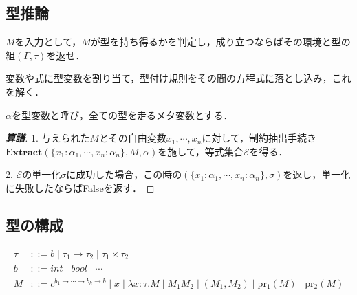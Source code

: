 \documentclass[uplatex, dvipdfmx]{jsreport}
\begin{document}
\subsection{型推論}
\begin{question*}
    $M$を入力として，$M$が型を持ち得るかを判定し，成り立つならばその環境と型の組$(\Gamma,\tau)$を返せ．
\end{question*}
変数や式に型変数を割り当て，型付け規則をその間の方程式に落とし込み，これを解く．
\begin{notation}[型変数]
    $\alpha$を型変数と呼び，全ての型を走るメタ変数とする．
\end{notation}
\begin{proof}[\textbf{算譜}]
    1. 与えられた$M$とその自由変数$x_1,\cdots,x_n$に対して，制約抽出手続き$\mathbf{Extract}(\{x_1:\alpha_1,\cdots,x_n:\alpha_n\},M,\alpha)$を施して，等式集合$\mathcal{E}$を得る．

    2. $\mathcal{E}$の単一化$\sigma$に成功した場合，この時の$(\{x_1:\alpha_1,\cdots,x_n:\alpha_n\},\sigma)$を返し，単一化に失敗したならばFalseを返す．
\end{proof}

\subsection{型の構成}

\begin{definition}
    \begin{align*}
        \tau &::= b\mid \tau_1\to\tau_2 \mid \tau_1\times\tau_2 \\
        b &::= int\mid bool\mid\cdots \\
        M &::= c^{b_1\to\cdots\to b_k\to b}\mid x\mid \lambda x:\tau.M\mid M_1M_2 \mid (M_1,M_2) \mid \mathrm{pr_1}(M) \mid \mathrm{pr_2}(M)
    \end{align*}
\end{definition}
\end{document}
